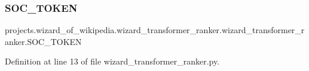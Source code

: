 \subsubsection{\texorpdfstring{S\+O\+C\+\_\+\+T\+O\+K\+EN}{SOC\_TOKEN}}
{\footnotesize\ttfamily projects.\+wizard\+\_\+of\+\_\+wikipedia.\+wizard\+\_\+transformer\+\_\+ranker.\+wizard\+\_\+transformer\+\_\+ranker.\+S\+O\+C\+\_\+\+T\+O\+K\+EN}



Definition at line 13 of file wizard\+\_\+transformer\+\_\+ranker.\+py.

